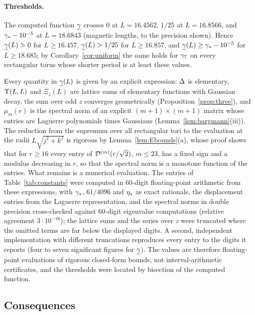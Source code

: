 \paragraph{Thresholds.} The computed function $\underline{\gamma}$ crosses $0$ at $L=16.4562$, $1/25$ at $L=16.8566$, and $\gamma_{*}-10^{-5}$ at
$L=18.6843$ (magnetic lengths, to the precision shown). Hence $\underline{\gamma}(L)>0$ for $L\ge16.457$, $\underline{\gamma}(L)>1/25$ for $L\ge16.857$, and
$\underline{\gamma}(L)\ge\gamma_{*}-10^{-5}$ for $L\ge18.685$; by Corollary~\ref{cor:uniform} the same holds for $\gamma_{\mathbb{T}}$ on every rectangular torus whose
shorter period is at least these values.

\begin{remark}\label{rem:evaluation}
Every quantity in $\underline{\gamma}(L)$ is given by an explicit expression: $\Delta$ is elementary, $\Upsilon(L,L)$ and $\Xi_z(L)$ are lattice sums of
elementary functions with Gaussian decay, the sum over odd $z$ converges geometrically (Proposition~\ref{prop:three}), and
$\mu_m(r)$ is the spectral norm of an explicit $(m+1)\times(m+1)$ matrix whose entries are Laguerre polynomials times Gaussians
(Lemma~\ref{lem:bargmann}(iii)). The reduction from the supremum over all rectangular tori to the evaluation at the radii $L\sqrt{j^2+k^2}$ is
rigorous by Lemma~\ref{lem:Ebounds}(a), whose proof shows that for $r\ge16$ every entry of $\mathcal{D}^{(m)}(r/\sqrt2)$, $m\le23$, has a fixed
sign and a modulus decreasing in $r$, so that the spectral norm is a monotone function of the entries. What remains is a
numerical evaluation. The entries of Table~\ref{tab:constants} were computed in $60$-digit floating-point arithmetic from these
expressions, with $\gamma_{*}$, $61/4096$ and $\eta_{*}$ as exact rationals, the displacement entries from the Laguerre representation, and
the spectral norms in double precision cross-checked against $60$-digit eigenvalue computations (relative agreement
$3\cdot10^{-16}$); the lattice sums and the series over $z$ were truncated where the omitted terms are far below the displayed
digits. A second, independent implementation with different truncations reproduces every entry to the digits it reports (four
to seven significant figures for $\underline{\gamma}$). The values are therefore
floating-point evaluations of rigorous closed-form bounds, not interval-arithmetic certificates, and the thresholds were located
by bisection of the computed function.
\end{remark}

\subsection{Consequences}

